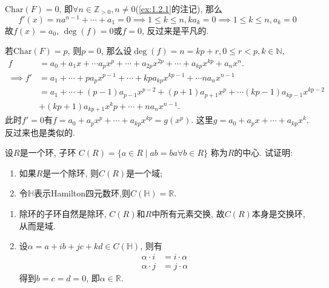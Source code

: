 \begin{solution}
    $\mathrm{Char}(F) = 0$, 即$\forall n \in \mathbb{Z}_{>0}, n \neq 0$(\ref{ex:1.2.1}的注记), 那么
\[
    f'(x) = na^{n - 1} + \cdots + a_1 = 0 \implies 1 \leqslant k \leqslant n, ka_k = 0 \implies 1 \leqslant k \leqslant n, a_k = 0
\]
故$f(x) = a_0$, $\deg(f) = 0$或$f = 0$, 反过来是平凡的.

    若$\mathrm{Char}(F) = p$, 则$p = 0$, 那么设$\deg(f) = n = kp + r, 0 \leqslant r < p, k \in \mathbb{N}$,
\[
\begin{aligned}
    f &= a_0 + a_1x + \cdots a_px^p + \cdots + a_{2p}x^{2p} + \cdots + a_{kp}x^{kp} + a_nx^n.\\
    \implies f' &= a_1 + \cdots + pa_px^{p - 1} + \cdots + kpa_{kp}x^{kp - 1} + \cdots na_nx^{n - 1}\\
    &= a_1 + \cdots + (p - 1)a_{p - 1}x^{p - 2} + (p + 1)a_{p + 1}x^p + \cdots (kp - 1)a_{kp - 1}x^{kp - 2}\\
    &+ (kp + 1)a_{kp + 1}x^kp + \cdots + na_nx^{n - 1}.
\end{aligned}
\]
此时$f' = 0$有$f = a_0 + a_px^p + \cdots + a_{kp}x^{kp} = g(x^p)$. 这里$g = a_0 + a_px + \cdots + a_{kp}x^k$. 反过来也是类似的.
\end{solution}

\begin{problem}\label{ex:2.1.11}
    设$R$是一个环, 子环
$C(R) = \{a \in R \mid ab = ba \forall b \in R\}$
称为$R$的中心. 试证明:
\begin{enumerate}[(1)]
    \item 如果$R$是一个除环, 则$C(R)$是一个域;
    \item 令$\mathbb{H}$表示Hamilton四元数环,则$C(\mathbb{H}) = \mathbb{R}$.
\end{enumerate}
\end{problem}

\begin{solution}
    \begin{enumerate}[(1)]
        \item 除环的子环自然是除环, $C(R)$和$R$中所有元素交换, 故$C(R)$本身是交换环, 从而是域.
        \item 设$\alpha = a + ib + jc + kd \in C(\mathbb{H})$, 则有
        \[
        \begin{aligned}
            \alpha \cdot i &= i \cdot \alpha\\
            \alpha \cdot j &= j \cdot \alpha
        \end{aligned}
        \]
        得到$b = c = d = 0$, 即$\alpha \in \mathbb{R}$.
    \end{enumerate}
\end{solution}

